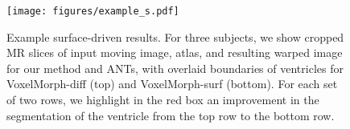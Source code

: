 \documentclass{article}
\begin{document}
\newpage

\begin{figure}[h!]
	\vspace{1.1cm}
	\begin{center}
		\texttt{[image: figures/example\_s.pdf]}
	\end{center}
	\caption{Example surface-driven results. For three subjects, we show cropped MR slices of input moving image, atlas, and resulting warped image for our method and ANTs, with overlaid boundaries of ventricles for VoxelMorph-diff (top) and VoxelMorph-surf (bottom). For each set of two rows, we highlight in the red box an improvement in the segmentation of the ventricle from the top row to the bottom row.
	}
	\label{fig:sup:reg_examples_supervised}
\end{figure}

















 
\end{document}
